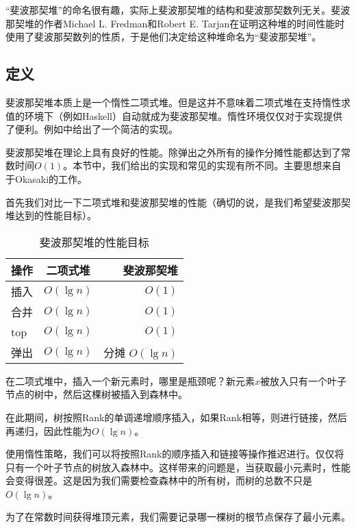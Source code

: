 \documentclass{ctexart}
\begin{document}
“斐波那契堆”的命名很有趣，实际上斐波那契堆的结构和斐波那契数列无关。斐波那契堆的作者Michael L. Fredman和Robert E. Tarjan在证明这种堆的时间性能时使用了斐波那契数列的性质，于是他们决定给这种堆命名为“斐波那契堆”\cite{CLRS}。

\subsection{定义}

斐波那契堆本质上是一个惰性二项式堆。但是这并不意味着二项式堆在支持惰性求值的环境下（例如Haskell）自动就成为斐波那契堆。惰性环境仅仅对于实现提供了便利。例如\cite{hackage-fibq}中给出了一个简洁的实现。

斐波那契堆在理论上具有良好的性能。除弹出之外所有的操作分摊性能都达到了常数时间$O(1)$。本节中，我们给出的实现和常见的实现\cite{CLRS}有所不同。主要思想来自于Okasaki的工作\cite{okasaki-fibh}。

首先我们对比一下二项式堆和斐波那契堆的性能（确切的说，是我们希望斐波那契堆达到的性能目标）。

\begin{table}[htbp]
\centering
\begin{tabular}{l | c | r}
  \hline
  操作 & 二项式堆 & 斐波那契堆 \\
  \hline
  插入 & $O(\lg n)$ & $O(1)$ \\
  合并 & $O(\lg n)$ & $O(1)$ \\
  top & $O(\lg n)$ & $O(1)$ \\
  弹出 & $O(\lg n)$ & 分摊 $O(\lg n)$ \\
  \hline
\end{tabular}
\caption{斐波那契堆的性能目标}
\end{table}

在二项式堆中，插入一个新元素时，哪里是瓶颈呢？新元素$x$被放入只有一个叶子节点的树中，然后这棵树被插入到森林中。

在此期间，树按照Rank的单调递增顺序插入，如果Rank相等，则进行链接，然后再递归，因此性能为$O(\lg n)$。

使用惰性策略，我们可以将按照Rank的顺序插入和链接等操作推迟进行。仅仅将只有一个叶子节点的树放入森林中。这样带来的问题是，当获取最小元素时，性能会变得很差。这是因为我们需要检查森林中的所有树，而树的总数不只是$O(\lg n)$。

为了在常数时间获得堆顶元素，我们需要记录哪一棵树的根节点保存了最小元素。
\end{document}
